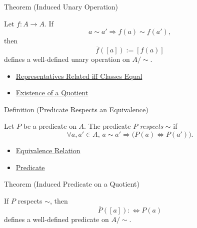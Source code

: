 \begin{theorembox}{Theorem (Induced Unary Operation)}
\begin{theorem}
\label{thm:induced-unary-operation-on-quotient}
Let $f:A\to A$. If
\[
a\sim a'\Longrightarrow f(a)\sim f(a'),
\]
then
\[
\overline{f}([a]):=[f(a)]
\]
defines a well-defined unary operation on $A/{\sim}$.
\end{theorem}
\end{theorembox}

\begin{dependencies}
\begin{itemize}
  \item \hyperref[prop:representatives-related-iff-classes-equal]{Representatives Related iff Classes Equal}
  \item \hyperref[thm:existence-of-a-quotient]{Existence of a Quotient}
\end{itemize}
\end{dependencies}

\begin{definitionbox}{Definition (Predicate Respects an Equivalence)}
\begin{definition}
\label{def:predicate-respects-equivalence}
Let $P$ be a predicate on $A$. The predicate $P$ \emph{respects} $\sim$ if
\[
\forall a,a'\in A,\,
a\sim a'\Longrightarrow \bigl(P(a)\Longleftrightarrow P(a')\bigr).
\]
\end{definition}
\end{definitionbox}

\begin{dependencies}
\begin{itemize}
  \item \hyperref[def:equivalence-relation]{Equivalence Relation}
  \item \hyperref[def:predicate]{Predicate}
\end{itemize}
\end{dependencies}

\begin{theorembox}{Theorem (Induced Predicate on a Quotient)}
\begin{theorem}
\label{thm:induced-predicate-on-quotient}
If $P$ respects $\sim$, then
\[
\overline{P}([a]):\Longleftrightarrow P(a)
\]
defines a well-defined predicate on $A/{\sim}$.
\end{theorem}
\end{theorembox}

